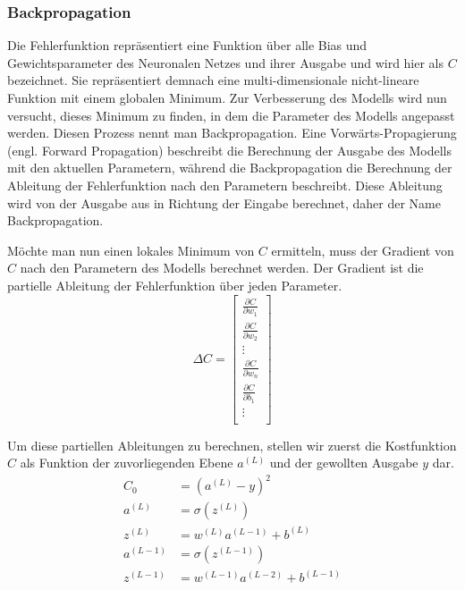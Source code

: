 \subsubsection{Backpropagation}
Die Fehlerfunktion repräsentiert eine Funktion über alle Bias und Gewichtsparameter des Neuronalen Netzes und ihrer Ausgabe und wird hier als $C$ bezeichnet.
Sie repräsentiert demnach eine multi-dimensionale nicht-lineare Funktion mit einem globalen Minimum.
Zur Verbesserung des Modells wird nun versucht, dieses Minimum zu finden, in dem die Parameter des Modells angepasst werden. Diesen Prozess nennt man Backpropagation.
Eine Vorwärts-Propagierung (engl. Forward Propagation) beschreibt die Berechnung der Ausgabe des Modells mit den aktuellen Parametern, während die Backpropagation die Berechnung der Ableitung der Fehlerfunktion nach den Parametern beschreibt.
Diese Ableitung wird von der Ausgabe aus in Richtung der Eingabe berechnet, daher der Name Backpropagation.

Möchte man nun einen lokales Minimum von $C$ ermitteln, muss der Gradient von $C$ nach den Parametern des Modells berechnet werden. Der Gradient ist die partielle Ableitung der Fehlerfunktion über jeden Parameter.
\begin{equation}
    \Delta C = \begin{bmatrix}
        \frac{\partial C}{\partial w_1} \\
        \frac{\partial C}{\partial w_2} \\
        \vdots \\
        \frac{\partial C}{\partial w_n} \\
        \frac{\partial C}{\partial b_1} \\
        \vdots \\
        \end{bmatrix}
\end{equation}

Um diese partiellen Ableitungen zu berechnen, stellen wir zuerst die Kostfunktion $C$ als Funktion der zuvorliegenden Ebene $a^{(L)}$  und der gewollten Ausgabe $y$ dar.
\begin{align}
    C_0 &= (a^{(L)} - y)^2\\
    a^{(L)} &= \sigma(z^{(L)})\\
    z^{(L)} &= w^{(L)}a^{(L-1)} + b^{(L)}\\
    a^{(L-1)} &= \sigma(z^{(L-1)})\\
    z^{(L-1)} &= w^{(L-1)}a^{(L-2)} + b^{(L-1)}\\
\end{align}

